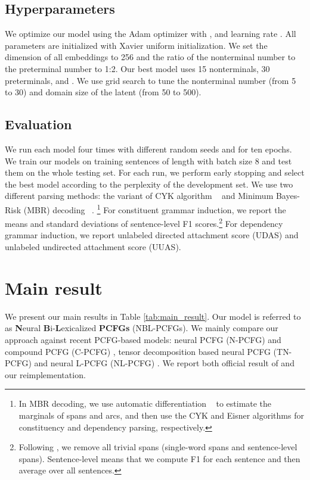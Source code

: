 \documentclass[11pt,a4paper]{article}
\begin{document}
\subsection{Hyperparameters}
We optimize our model using the Adam optimizer with , and learning rate .
All parameters are initialized with Xavier uniform initialization. We set the dimension of all embeddings to 256 and the ratio of the nonterminal number to the preterminal number to 1:2. Our best model uses 15 nonterminals, 30 preterminals, and .
We use grid search to tune the nonterminal number (from 5 to 30) and domain size  of the latent  (from 50 to 500).

\subsection{Evaluation}
We run each model four times with different random seeds and for ten epochs. We train our models on training sentences of length  with batch size 8 and test them on the whole testing set. 
For each run, we perform early stopping and select the best model according to the perplexity of the development set. We use two different parsing methods: the variant of CYK algorithm ~\cite{eisner-satta-1999-efficient} and Minimum Bayes-Risk (MBR) decoding ~\cite{smith-eisner-2006-minimum}. \footnote{In MBR decoding, we use automatic differentiation ~\citep{eisner-2016-inside, rush-2020-torch} to estimate the marginals of spans and arcs, and then use the CYK and Eisner algorithms for constituency and dependency parsing, respectively.} For constituent grammar induction, we report the means and standard deviations of sentence-level F1 scores.\footnote{Following \citet{kim-etal-2019-compound}, we remove all trivial spans (single-word spans and sentence-level spans). Sentence-level means that we compute F1 for each sentence and then average over all sentences.} For dependency grammar induction, we report unlabeled directed attachment score (UDAS) and unlabeled undirected attachment score (UUAS). 

\section{Main result}             
We present our main results in Table \ref{tab:main_result}. Our model is referred to as \textbf{N}eural \textbf{B}i-\textbf{L}exicalized \textbf{PCFGs} (NBL-PCFGs).
We mainly compare our approach against recent PCFG-based models: neural PCFG (N-PCFG) and compound PCFG (C-PCFG) \cite{kim-etal-2019-compound}, tensor decomposition based neural PCFG (TN-PCFG) \cite{yang-etal-2021-pcfgs} and neural L-PCFG (NL-PCFG) \cite{zhu-etal-2020-return}.
We report both official result of \citet{zhu-etal-2020-return} and our reimplementation. 
\end{document}
